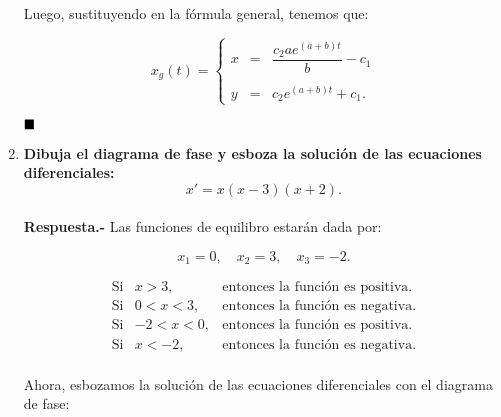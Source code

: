 \begin{enumerate}
\begin{multicols}{2}
	Luego, sustituyendo en la fórmula general, tenemos que:
	\begin{tcolorbox}
	$$x_g(t)=\left\{\begin{array}{rcl}
		x&=&\dfrac{c_2ae^{(a+b)t}}{b}-c_1\\\\
		y&=&c_2e^{(a+b)t}+c_1.
		\end{array}\right.$$
	\end{tcolorbox}
	$\hfill\blacksquare$


    \end{multicols}

    \item \textbf{\boldmath Dibuja el diagrama de fase y esboza la solución de las ecuaciones diferenciales:
    $$x'=x(x-3)(x+2).$$\\
	Respuesta.-}\; Las funciones de equilibro estarán dada por:
	\begin{tcolorbox}
	    $$x_1=0,\quad x_2=3,\quad x_3=-2.$$
	\end{tcolorbox}
	$$
	\begin{array}{rcr}
	    \mbox{Si} &x>3,&\mbox{entonces la función es positiva.}\\
	    \mbox{Si} &0<x<3,&\mbox{entonces la función es negativa.}\\
	    \mbox{Si} &-2<x<0,&\mbox{entonces la función es positiva.}\\
	    \mbox{Si} &x<-2,&\mbox{entonces la función es negativa.}\\
	\end{array}
	$$

    Ahora, esbozamos la solución de las ecuaciones diferenciales con el diagrama de fase:

	\begin{center}
	    \begin{tikzpicture}[scale=0.7]
	    \end{tikzpicture}
    \end{center}


	\begin{center}
\end{center}
\end{enumerate}
